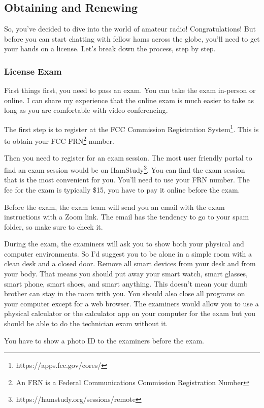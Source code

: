 \subsection{Obtaining and Renewing}
\label{subsec:obtain-renew}

So, you've decided to dive into the world of amateur radio! Congratulations! But before you can start chatting with fellow hams across the globe, you'll need to get your hands on a license. Let's break down the process, step by step.

\subsubsection{License Exam}
First things first, you need to pass an exam. You can take the exam in-person or online. 
I can share my experience that the online exam is much easier to take as long as you are comfortable with video conferencing.  

The first step is to register at the FCC Commission Registration System\footnote{https://apps.fcc.gov/cores/}. This is to obtain your FCC FRN\footnote{An FRN is a Federal Communications Commission Registration Number} number. 

Then you need to register for an exam session. The most user friendly portal to find an exam session would be on HamStudy\footnote{https://hamstudy.org/sessions/remote}. You can find the exam session that is the most convenient for you. You'll need to use your FRN number. The fee for the exam is typically \$15, you have to pay it online before the exam. 

Before the exam, the exam team will send you an email with the exam instructions with a Zoom link. The email has the tendency to go to your spam folder, so make sure to check it. 

During the exam, the examiners will ask you to show both your physical and computer environments. So I'd suggest you to be alone in a simple room with a clean desk and a closed door. Remove all smart devices from your desk and from your body. That means you should put away your smart watch, smart glasses, smart phone, smart shoes, and smart anything. This doesn't mean your dumb brother can stay in the room with you. You should also close all programs on your computer except for a web browser. The examiners would allow you to use a physical calculator or the calculator app on your computer for the exam but you should be able to do the technician exam without it. 

You have to show a photo ID to the examiners before the exam. 

